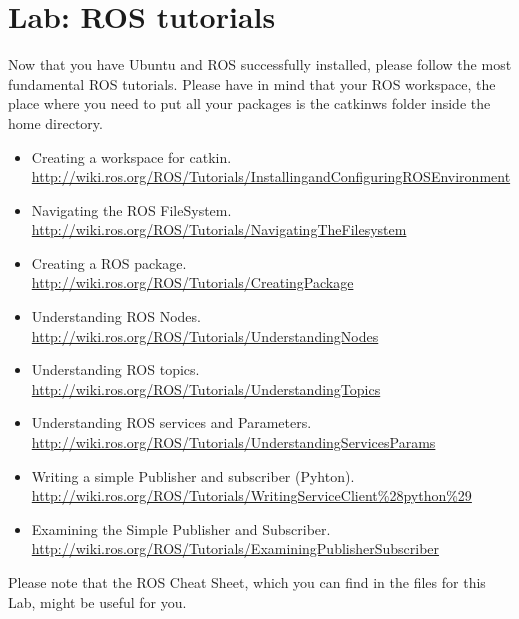 \documentclass[a4paper,10pt]{article}
\begin{document}
\section{Lab: ROS tutorials}
Now that you have Ubuntu and ROS successfully installed, please follow the most fundamental ROS tutorials. Please have in mind that your ROS workspace, the place where you need to put all your packages is the catkin{\textunderscore}ws folder inside the home directory.

\begin{itemize}
    \item Creating a workspace for catkin.\\
    \url{http://wiki.ros.org/ROS/Tutorials/InstallingandConfiguringROSEnvironment}
    
    \item Navigating the ROS FileSystem.\\
    \url{http://wiki.ros.org/ROS/Tutorials/NavigatingTheFilesystem}
    
    \item Creating a ROS package.\\
    \url{http://wiki.ros.org/ROS/Tutorials/CreatingPackage}
    
    \item Understanding ROS Nodes.\\
    \url{http://wiki.ros.org/ROS/Tutorials/UnderstandingNodes}
    
    \item Understanding ROS topics.\\
    \url{http://wiki.ros.org/ROS/Tutorials/UnderstandingTopics}
    
    \item Understanding ROS services and Parameters.\\
    \url{http://wiki.ros.org/ROS/Tutorials/UnderstandingServicesParams}
    
    \item Writing a simple Publisher and subscriber (Pyhton).\\
    \url{http://wiki.ros.org/ROS/Tutorials/WritingServiceClient%28python%29}
    
    \item Examining the Simple Publisher and Subscriber.\\
    \url{http://wiki.ros.org/ROS/Tutorials/ExaminingPublisherSubscriber}
\end{itemize}
\noindent
Please note that the ROS Cheat Sheet, which you can find in the files for this Lab, might be useful for you.
\end{document}
